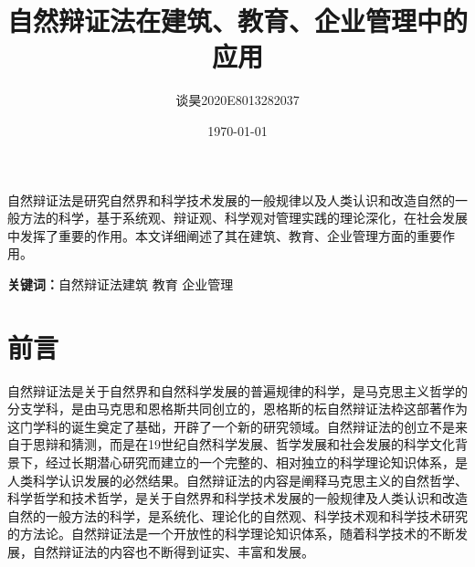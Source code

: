 \documentclass[UTF8,a4paper]{ctexart}
\title{\bfseries 自然辩证法在建筑、教育、企业管理中的应用 }
\author{谈昊\quad2020E8013282037\quad217}
\date{\today}
\begin{document}
\maketitle


\begin{center}
\parbox{130mm}{
自然辩证法是研究自然界和科学技术发展的一般规律以及人类认识和改造自然的一般方法的科学，基于系统观、辩证观、科学观对管理实践的理论深化，在社会发展中发挥了重要的作用。本文详细阐述了其在建筑、教育、企业管理方面的重要作用。
\par
\vspace{1mm}
{\bfseries 关键词：}自然辩证法\quad 建筑 \quad 教育 \quad 企业管理}
\end{center}



\section{前言}
自然辩证法是关于自然界和自然科学发展的普遍规律的科学，是马克思主义哲学的分支学科，是由马克思和恩格斯共同创立的，恩格斯的枟自然辩证法枠这部著作为这门学科的诞生奠定了基础，开辟了一个新的研究领域。自然辩证法的创立不是来自于思辩和猜测，而是在19世纪自然科学发展、哲学发展和社会发展的科学文化背景下，经过长期潜心研究而建立的一个完整的、相对独立的科学理论知识体系，是人类科学认识发展的必然结果。自然辩证法的内容是阐释马克思主义的自然哲学、科学哲学和技术哲学，是关于自然界和科学技术发展的一般规律及人类认识和改造自然的一般方法的科学，是系统化、理论化的自然观、科学技术观和科学技术研究的方法论。自然辩证法是一个开放性的科学理论知识体系，随着科学技术的不断发展，自然辩证法的内容也不断得到证实、丰富和发展。\cite{RN14}
\end{document}
